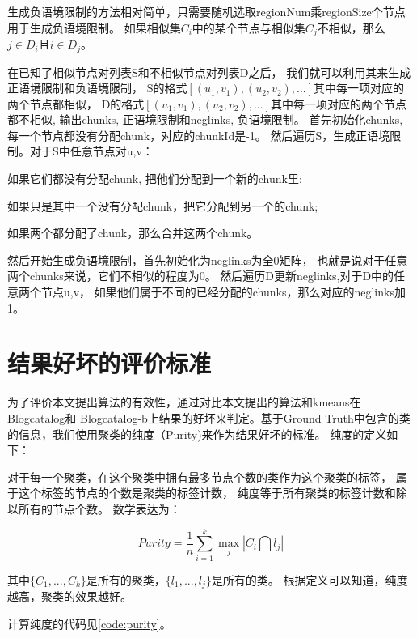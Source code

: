 生成负语境限制的方法相对简单，只需要随机选取regionNum乘regionSize个节点用于生成负语境限制。
如果相似集$C_i$中的某个节点与相似集$C_j$不相似，那么$j \in D_i$且$i \in D_j$。

在已知了相似节点对列表S和不相似节点对列表D之后，
我们就可以利用其来生成正语境限制和负语境限制，
S的格式$[(u_1, v_1), (u_2, v_2), ...]$其中每一项对应的两个节点都相似，
D的格式$[(u_1, v_1), (u_2, v_2), ...]$其中每一项对应的两个节点都不相似,
输出chunks, 正语境限制和neglinks, 负语境限制。
首先初始化chunks, 每一个节点都没有分配chunk，对应的chunkId是-1。
然后遍历S，生成正语境限制。对于S中任意节点对u,v：
\begin{inparaenum}[a)]
    \item 如果它们都没有分配chunk, 把他们分配到一个新的chunk里;
    \item 如果只是其中一个没有分配chunk，把它分配到另一个的chunk;
    \item 如果两个都分配了chunk，那么合并这两个chunk。
\end{inparaenum}
然后开始生成负语境限制，首先初始化为neglinks为全0矩阵，
也就是说对于任意两个chunks来说，它们不相似的程度为0。
然后遍历D更新neglinks,对于D中的任意两个节点u,v，
如果他们属于不同的已经分配的chunks，那么对应的neglinks加1。

\section{结果好坏的评价标准}

为了评价本文提出算法的有效性，通过对比本文提出的算法和kmeans在Blogcatalog和
Blogcatalog-b上结果的好坏来判定。基于Ground Truth中包含的类的信息，我们使用聚类的纯度（Purity)来作为结果好坏的标准。
纯度的定义如下：

对于每一个聚类，在这个聚类中拥有最多节点个数的类作为这个聚类的标签，
属于这个标签的节点的个数是聚类的标签计数，
纯度等于所有聚类的标签计数和除以所有的节点个数。
数学表达为：

\begin{equation}
\label{equa:purity}
Purity = \frac{1}{n} \sum_{i=1}^k \operatorname*{max}_j |C_i \bigcap l_j|
\end{equation}

其中$\{C_1, ..., C_k\}$是所有的聚类，$\{l_1, ..., l_j\}$是所有的类。
根据定义可以知道，纯度越高，聚类的效果越好。

计算纯度的代码见\ref{code:purity}。

